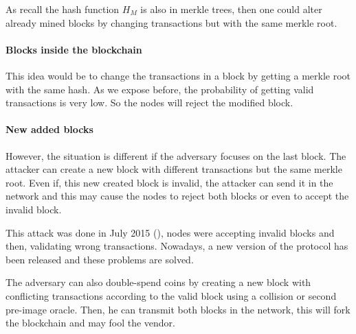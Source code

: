 As recall the hash function $H_M$ is also in merkle trees, then one could alter already mined blocks by changing transactions but with the same merkle root.

    \paragraph{Blocks inside the blockchain}

This idea would be to change the transactions in a block by getting a merkle root with the same hash. As we expose before, the probability of getting valid transactions is very low. So the nodes will reject the modified block.

    \paragraph{New added blocks}

However, the situation is different if the adversary focuses on the last block. The attacker can create a new block with different transactions but the same merkle root. Even if, this new created block is invalid, the attacker can send it in the network and this may cause the nodes to reject both blocks or even to accept the invalid block.

This attack was done in July 2015 (\cite{mining_attack}), nodes were accepting invalid blocks and then, validating wrong transactions. Nowadays, a new version of the protocol has been released and these problems are solved. \newline

The adversary can also double-spend coins by creating a new block with conflicting transactions according to the valid block using a collision or second pre-image oracle. Then, he can transmit both blocks in the network, this will fork the blockchain and may fool the vendor.

